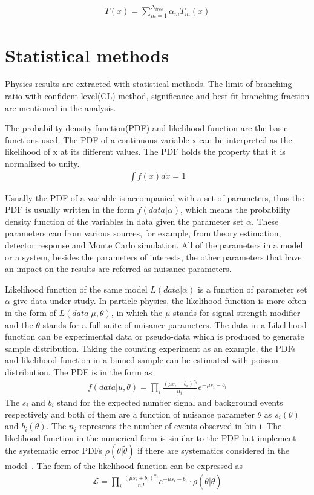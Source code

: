 \begin{align}\label{Equ.boostingeventweight} 
T(x)=\sum_{m=1}^{N_{tree}}\alpha_{m}T_{m}(x)
\end{align}



\section{Statistical methods}

Physics results are extracted with statistical methods. The limit of branching ratio with confident level(CL) method, significance and best fit branching fraction are mentioned in the analysis.  

The probability density function(PDF) and likelihood function are the basic functions used. The PDF of a continuous variable x can be interpreted as the likelihood of x at its different values. The PDF holds the property that it is normalized to unity. 
\begin{align*}
\int f(x) dx =1
\end{align*}

Usually the PDF of a variable is accompanied with a set of parameters, thus the PDF is usually written in the form $f(data|\alpha)$, which means the probability density function of the variables in data  given the parameter set $\alpha$. These parameters can from various sources, for example, from theory estimation, detector response and Monte Carlo simulation. All of the parameters in a model or a system, besides the parameters of interests, the other parameters that have an impact on the results are referred as nuisance parameters.       


Likelihood function of the same model $L(data|\alpha)$ is a function of parameter set $\alpha$ give data under study. In particle physics, the likelihood function is more often in the form of $L(data|\mu,\theta)$, in which the $\mu$ stands for signal strength modifier and the $\theta$ stands for a full suite of nuisance parameters. The data in a Likelihood function can be experimental data or pseudo-data which is produced to generate sample distribution. 
Taking the counting experiment as an example, the PDFs and likelihood function in a binned sample can be estimated with poisson distribution. The  PDF is in the form as
\begin{align*}
f(data|u,\theta)=\prod_{i}\frac{(\mu s_{i}+b_{i})^{n_{i}}}{n_{i}!}e^{-\mu s_{i}-b_{i}}
\end{align*}
The $s_{i}$ and $b_{i}$ stand for the expected number signal and background events respectively and both of them are a function of nuisance parameter $\theta$ as $s_{i}(\theta)$ and $b_{i}(\theta)$. The $n_{i}$ represents the number of events observed in bin i. The likelihood function in the numerical form is similar to the PDF but implement the systematic error PDFs $\rho(\theta|\tilde{\theta})$ if there are systematics considered in the model~\cite{CMS-NOTE-2011-005}. The form of the likelihood function can be expressed as 
\begin{align*}
\mathcal{L}=\prod_{i}\frac{(\mu s_{i}+b_{i})^{n_{i}}}{n_{i}!}e^{-\mu s_{i}-b_{i}}\cdot \rho(\tilde{\theta}|\theta)
\end{align*}

